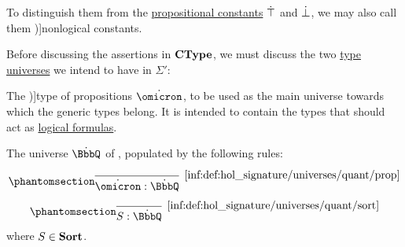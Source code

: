 \begin{definition}
\begin{thmenum}
    To distinguish them from the \hyperref[def:propositional_alphabet/constants]{propositional constants} \( \dot{\top} \) and \( \dot{\bot} \), we may also call them \term[en=nonlogical constants (\cite[211]{Andrews2002Logic})]{nonlogical constants}.

     Before discussing the assertions in \( \op*{CType} \), we must discuss the two \hyperref[def:mltt_signature/universe]{type universes} we intend to have in \( \Sigma' \):
    \begin{thmenum}
       The \term[en=type of propositions (\cite[56]{Church1940STT})]{type of propositions} \( \syn\omicron \), to be used as the main universe towards which the generic types belong. It is intended to contain the types that should act as \hyperref[con:proposition]{logical formulas}.

       The universe \( \syn\BbbQ \) of , populated by the following rules:
      \begin{paracol}{3}
        \begin{nthcolumn}{0}
          \ParacolAlignmentHack
          \begin{equation*}\taglabel[\ensuremath{ \BbbQ_{\omicron} }]{inf:def:hol_signature/universes/quant/prop}
            \begin{prooftree}
              \infer0[\ref{inf:def:hol_signature/universes/quant/prop}]{ \syn\omicron: \syn\BbbQ }
            \end{prooftree}
          \end{equation*}
        \end{nthcolumn}

        \begin{nthcolumn}{1}
          \ParacolAlignmentHack
          \begin{equation*}\taglabel[\ensuremath{ \BbbQ_{\logic{Sort}} }]{inf:def:hol_signature/universes/quant/sort}
            \begin{prooftree}
              \infer0[\ref{inf:def:hol_signature/universes/quant/sort}]{ S: \syn\BbbQ },
            \end{prooftree}
          \end{equation*}
          where \( S \in \op*{Sort} \).
        \end{nthcolumn}


\end{paracol}
\end{thmenum}
\end{thmenum}
\end{definition}
